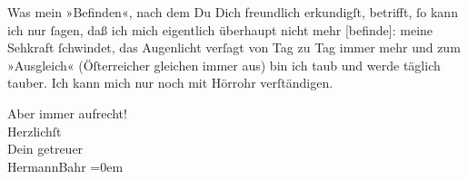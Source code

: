 \pstart
           Was mein »Befinden«, nach dem Du Dich freundlich erkundigſt, betrifft,{ }ſo kann ich
               nur{ }ſagen, daß ich mich eigentlich überhaupt nicht {\pb}mehr {[}befinde{]}: meine Sehkraft{ }ſchwindet, das Augenlicht verſagt
               von Tag zu Tag immer mehr und zum »Ausgleich« (Öſterreicher gleichen immer aus) bin ich taub und werde täglich tauber. Ich
               kann mich nur noch mit Hörrohr verſtändigen.\pend
           
\pstart
           Aber immer aufrecht!{\\[\baselineskip]}Herzlichſt{\\[\baselineskip]}Dein getreuer{\\[\baselineskip]}\spacefill\mbox{HermannBahr}\pend
           \leftskip=0em{}\endnumbering{}  \newcommand{\dateiname}{L02547}\newcommand{\titel}{Hermann Bahr an Arthur Schnitzler, 7. 9. 1931}\newcommand{\editorInnen}{Herausgegeben von Martin Anton Müller}
